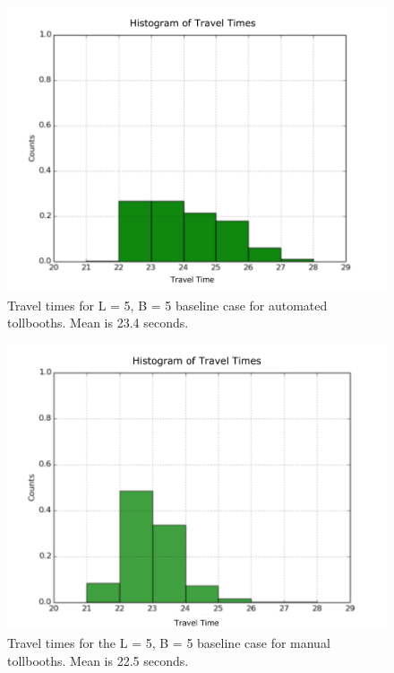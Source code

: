 \documentclass[a4paper, 11pt]{article}
\begin{document}


\begin{figure}[H]
\begin{center}
\includegraphics[scale=0.2]{Images/55_ez.png}
\caption{Travel times for L = 5, B = 5 baseline case for automated tollbooths. Mean is 23.4 seconds. }
\label{fig:ez55}
\end{center}
\end{figure}

\begin{figure}[H]
\begin{center}
\includegraphics[scale=0.2]{Images/55_man.png}
\caption{Travel times for the L = 5, B = 5 baseline case for manual tollbooths. Mean is 22.5 seconds.}
\label{fig:manual55}
\end{center}
\end{figure}
\end{document}
